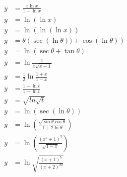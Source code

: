 \documentclass[fleqn]{article}
\begin{document}
\newpage
\thispagestyle{empty}
\begin{align*}
    y &= \frac{x\ln{x}}{1+\ln{x}} \\
    y &= \ln{\left(\ln{x}\right)} \\
    y &= \ln{\left(\ln{\left(\ln{x}\right)}\right)} \\
    y &= \theta\left(\sec{\left(\ln{\theta}\right)}) + \cos{\left(\ln{\theta}\right)}\right) \\
    y &= \ln{\left(\sec{\theta} + \tan{\theta}\right)} \\
    y &= \ln{\frac{1}{x\sqrt{x+1}}} \\
    y &= \frac{1}{2} \ln{\frac{1+x}{1-x}} \\
    y &= \frac{1+\ln{t}}{1-\ln{t}} \\
    y &= \sqrt{ln{\sqrt{t}}} \\
    y &= \ln{\left(\sec{\left(\ln{\theta}\right)}\right)} \\
    y &= \ln{\left(\frac{\sqrt{\sin{\theta} \cos{\theta}}}{1+2\ln{\theta}}\right)} \\
    y &= \ln{\left(\frac{\left(x^2+1\right)^5}{\sqrt{1-x}}\right)} \\
    y &= \ln{\sqrt{\frac{\left(x+1\right)^5}{\left(x+2\right)^{20}}}}
\end{align*}
\end{document}
